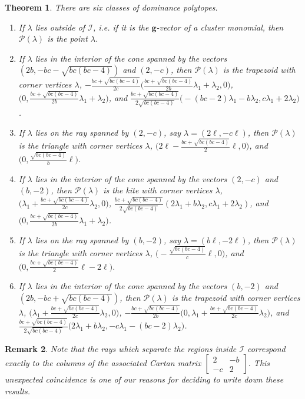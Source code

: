\documentclass{amsart}
\newtheorem{theorem}{Theorem}
\newtheorem{remark}[theorem]{Remark}
\numberwithin{theorem}{section}
\newcommand{\bfg}{\boldsymbol{g}}
\newcommand{\cI}{\mathcal{I}}
\newcommand{\cP}{\mathcal{P}}
\begin{document}
  \begin{theorem}
    \label{th:dominance vertices}
    There are six classes of dominance polytopes.
    \begin{enumerate}
      \item If $\lambda$ lies outside of $\cI$, i.e. if it is the $\bfg$-vector of a cluster monomial, then $\cP(\lambda)$ is the point $\lambda$. 
      \item If $\lambda$ lies in the interior of the cone spanned by the vectors $(2b,-bc-\sqrt{bc(bc-4)})$ and $(2,-c)$, then $\cP(\lambda)$ is the trapezoid with corner vertices $\lambda$, $-\frac{bc+\sqrt{bc(bc-4)}}{2c}\big(\frac{bc+\sqrt{bc(bc-4)}}{2b}\lambda_1+\lambda_2,0\big)$, $\big(0,\frac{bc+\sqrt{bc(bc-4)}}{2b}\lambda_1+\lambda_2\big)$, and $\frac{bc+\sqrt{bc(bc-4)}}{2\sqrt{bc(bc-4)}}\big(-(bc-2)\lambda_1-b\lambda_2,c\lambda_1+2\lambda_2\big)$.
      \item If $\lambda$ lies on the ray spanned by $(2,-c)$, say $\lambda=(2\ell,-c\ell)$, then $\cP(\lambda)$ is the triangle with corner vertices $\lambda$, $\big(2\ell-\frac{bc+\sqrt{bc(bc-4)}}{2}\ell,0\big)$, and $\big(0,\frac{\sqrt{bc(bc-4)}}{b}\ell\big)$.
      \item If $\lambda$ lies in the interior of the cone spanned by the vectors $(2,-c)$ and $(b,-2)$, then $\cP(\lambda)$ is the kite with corner vertices $\lambda$, $\big(\lambda_1+\frac{bc+\sqrt{bc(bc-4)}}{2c}\lambda_2,0\big)$, $\frac{bc+\sqrt{bc(bc-4)}}{2\sqrt{bc(bc-4)}}(2\lambda_1+b\lambda_2,c\lambda_1+2\lambda_2)$, and $\big(0,\frac{bc+\sqrt{bc(bc-4)}}{2b}\lambda_1+\lambda_2\big)$.
      \item If $\lambda$ lies on the ray spanned by $(b,-2)$, say $\lambda=(b\ell,-2\ell)$, then $\cP(\lambda)$ is the triangle with corner vertices $\lambda$, $\big(-\frac{\sqrt{bc(bc-4)}}{c}\ell,0\big)$, and $\big(0,\frac{bc+\sqrt{bc(bc-4)}}{2}\ell-2\ell\big)$.
      \item If $\lambda$ lies in the interior of the cone spanned by the vectors $(b,-2)$ and $(2b,-bc+\sqrt{bc(bc-4)})$, then $\cP(\lambda)$ is the trapezoid with corner vertices $\lambda$, $\big(\lambda_1+\frac{bc+\sqrt{bc(bc-4)}}{2c}\lambda_2,0\big)$, $-\frac{bc+\sqrt{bc(bc-4)}}{2b}\big(0,\lambda_1+\frac{bc+\sqrt{bc(bc-4)}}{2c}\lambda_2\big)$, and $\frac{bc+\sqrt{bc(bc-4)}}{2\sqrt{bc(bc-4)}}\big(2\lambda_1+b\lambda_2,-c\lambda_1-(bc-2)\lambda_2\big)$.
    \end{enumerate}
  \end{theorem}

  \begin{remark}
    Note that the rays which separate the regions inside $\cI$ correspond exactly to the columns of the associated Cartan matrix $\left[ \begin{array}{cc} 2 & -b \\ -c & 2 \end{array} \right]$.
    This unexpected coincidence is one of our reasons for deciding to write down these results.
  \end{remark}
\end{document}
